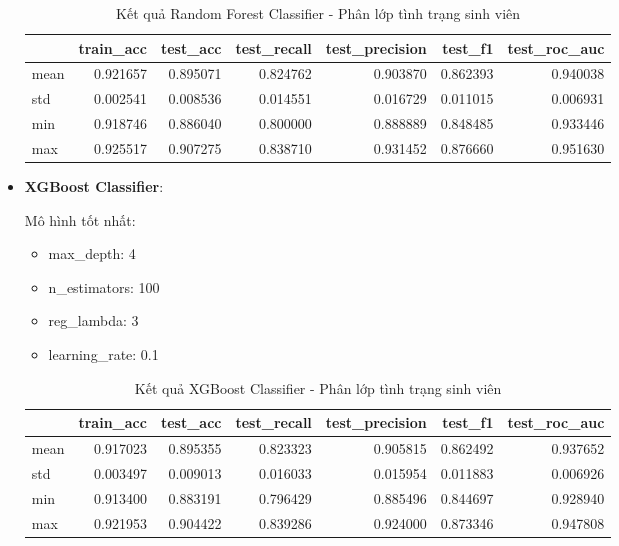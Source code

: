 \begin{itemize}
            \begin{table}[htbp]
                \centering
                \caption{Kết quả Random Forest Classifier - Phân lớp tình trạng sinh viên}
                \label{tab:RF-Dropout}
                \begin{tabular}{lrrrrrr}
                    \hline
                     & train\_acc & test\_acc & test\_recall & test\_precision & test\_f1 & test\_roc\_auc \\
                    \hline
                    mean & 0.921657 & 0.895071 & 0.824762 & 0.903870 & 0.862393 & 0.940038 \\
                    std & 0.002541 & 0.008536 & 0.014551 & 0.016729 & 0.011015 & 0.006931 \\
                    min & 0.918746 & 0.886040 & 0.800000 & 0.888889 & 0.848485 & 0.933446 \\
                    max & 0.925517 & 0.907275 & 0.838710 & 0.931452 & 0.876660 & 0.951630 \\
                    \hline
                \end{tabular}
            \end{table}
            
            \FloatBarrier

        \item \textbf{XGBoost Classifier}:
        
            Mô hình tốt nhất:
            \begin{itemize}
                \item max\_depth: 4
                \item n\_estimators: 100
                \item reg\_lambda: 3
                \item learning\_rate: 0.1
            \end{itemize}

            \begin{table}[htbp]
                \centering
                \caption{Kết quả XGBoost Classifier - Phân lớp tình trạng sinh viên}
                \label{tab:XGB-Dropout}
                \begin{tabular}{lrrrrrr}
                \hline
                 & train\_acc & test\_acc & test\_recall & test\_precision & test\_f1 & test\_roc\_auc \\
                \hline
                mean & 0.917023 & 0.895355 & 0.823323 & 0.905815 & 0.862492 & 0.937652 \\
                std & 0.003497 & 0.009013 & 0.016033 & 0.015954 & 0.011883 & 0.006926 \\
                min & 0.913400 & 0.883191 & 0.796429 & 0.885496 & 0.844697 & 0.928940 \\
                max & 0.921953 & 0.904422 & 0.839286 & 0.924000 & 0.873346 & 0.947808 \\
                \hline
                \end{tabular}
            \end{table}

            \FloatBarrier
    \end{itemize}

